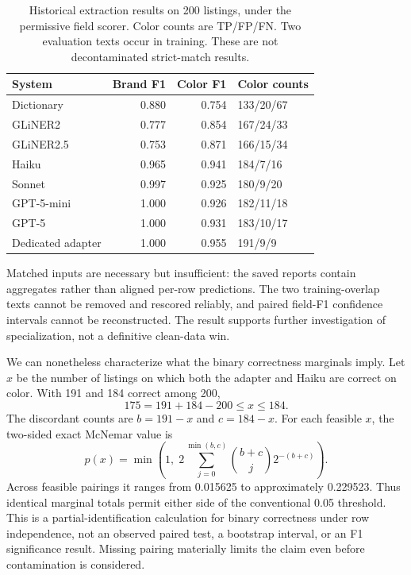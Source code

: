 \begin{table}[t]
\centering\small
\caption{Historical extraction results on 200 listings, under the permissive field scorer. Color counts are TP/FP/FN. Two evaluation texts occur in training. These are not decontaminated strict-match results.}
\label{tab:extract}
\setlength{\tabcolsep}{3pt}
\begin{tabular}{lrrl}
\toprule
System&Brand F1&Color F1&Color counts\\\midrule
Dictionary&0.880&0.754&133/20/67\\
GLiNER2&0.777&0.854&167/24/33\\
GLiNER2.5&0.753&0.871&166/15/34\\
Haiku&0.965&0.941&184/7/16\\
Sonnet&0.997&0.925&180/9/20\\
GPT-5-mini&1.000&0.926&182/11/18\\
GPT-5&1.000&0.931&183/10/17\\
Dedicated adapter&1.000&0.955&191/9/9\\\bottomrule
\end{tabular}
\end{table}

Matched inputs are necessary but insufficient: the saved reports contain aggregates rather than aligned per-row predictions. The two training-overlap texts cannot be removed and rescored reliably, and paired field-F1 confidence intervals cannot be reconstructed. The result supports further investigation of specialization, not a definitive clean-data win.

We can nonetheless characterize what the binary correctness marginals imply. Let $x$ be the number of listings on which both the adapter and Haiku are correct on color. With 191 and 184 correct among 200,
\begin{equation}
175=191+184-200\leq x\leq184.
\end{equation}
The discordant counts are $b=191-x$ and $c=184-x$. For each feasible $x$, the two-sided exact McNemar value is
\begin{equation}
p(x)=\min\left(1,\;2\sum_{j=0}^{\min(b,c)}
\binom{b+c}{j}2^{-(b+c)}\right).
\end{equation}
Across feasible pairings it ranges from 0.015625 to approximately 0.229523. Thus identical marginal totals permit either side of the conventional 0.05 threshold. This is a partial-identification calculation for binary correctness under row independence, not an observed paired test, a bootstrap interval, or an F1 significance result. Missing pairing materially limits the claim even before contamination is considered.

